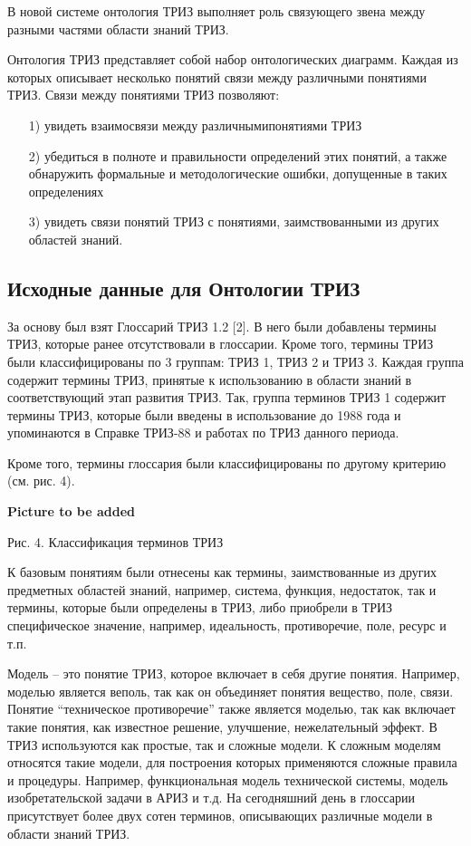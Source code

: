 \documentclass[11pt,a4paper]{article}
\newcommand{\addpicture}{\textbf{Picture to be added}\par}
\begin{document}
В новой системе онтология ТРИЗ выполняет роль связующего звена между разными
частями области знаний ТРИЗ.

Онтология ТРИЗ представляет собой набор онтологических диаграмм. Каждая из
которых описывает несколько понятий связи между различными понятиями ТРИЗ.
Связи между понятиями ТРИЗ позволяют:
\begin{itemize}
\item[1)] увидеть взаимосвязи между различнымипонятиями ТРИЗ
\item[2)] убедиться в полноте и правильности определений этих понятий, а также
  обнаружить формальные и методологические ошибки, допущенные в таких
  определениях
\item[3)] увидеть связи понятий ТРИЗ с понятиями, заимствованными из других
  областей знаний.
\end{itemize}

\subsection{Исходные данные для Онтологии ТРИЗ}

За основу был взят Глоссарий ТРИЗ 1.2 [2]. В него были добавлены термины ТРИЗ,
которые ранее отсутствовали в глоссарии. Кроме того, термины ТРИЗ были
классифицированы по 3 группам: ТРИЗ 1, ТРИЗ 2 и ТРИЗ 3. Каждая группа содержит
термины ТРИЗ, принятые к использованию в области знаний в соответствующий этап
развития ТРИЗ. Так, группа терминов ТРИЗ 1 содержит термины ТРИЗ, которые были
введены в использование до 1988 года и упоминаются в Справке ТРИЗ-88 и
работах по ТРИЗ данного периода.

Кроме того, термины глоссария были классифицированы по другому критерию
(см. рис. 4).

\begin{center}
  \addpicture
  Рис. 4. Классификация терминов ТРИЗ
\end{center}

К базовым понятиям были отнесены как термины, заимствованные из других
предметных областей знаний, например, система, функция, недостаток, так и
термины, которые были определены в ТРИЗ, либо приобрели в ТРИЗ специфическое
значение, например, идеальность, противоречие, поле, ресурс и т.п.

Модель -- это понятие ТРИЗ, которое включает в себя другие понятия. Например,
моделью является веполь, так как он объединяет понятия вещество, поле, связи.
Понятие “техническое противоречие” также является моделью, так как включает
такие понятия, как известное решение, улучшение, нежелательный эффект. В ТРИЗ
используются как простые, так и сложные модели. К сложным моделям относятся
такие модели, для построения которых применяются сложные правила и процедуры.
Например, функциональная модель технической системы, модель изобретательской
задачи в АРИЗ и т.д. На сегодняшний день в глоссарии присутствует более двух
сотен терминов, описывающих различные модели в области знаний ТРИЗ.
\end{document}
